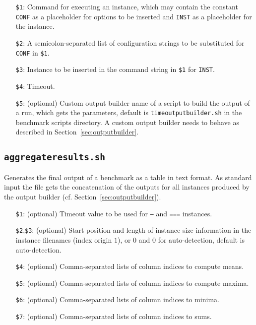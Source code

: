 \documentclass[a4paper]{article}
\begin{document}
		    \medskip{}
		    \begin{itemize}
				\item[{\tt \$1}:] Command for executing an instance, which may contain the constant {\tt CONF} as a placeholder
					for options to be inserted and {\tt INST} as a placeholder for the instance.
				\item[{\tt \$2}:] A semicolon-separated list of configuration strings to be substituted for {\tt CONF} in {\tt \$1}.
				\item[{\tt \$3}:] Instance to be inserted in the command string in {\tt \$1} for {\tt INST}.
				\item[{\tt \$4}:] Timeout.
				\item[{\tt \$5}:] (optional) Custom output builder name of a script to build the output of a run, which gets the parameters, default is {\tt timeoutputbuilder.sh}
					in the benchmark scripts directory. A custom output builder needs to behave as described in Section~\ref{sec:outputbuilder}.
		    \end{itemize}
				
		\subsection{\tt aggregateresults.sh}
		\label{sec:architecture:aggregate}
		
		    Generates the final output of a benchmark as a table in text format.
		    As standard input the file gets the concatenation of the outputs for all instances produced by the output builder (cf. Section~\ref{sec:outputbuilder}).

		    \medskip{}
		    \begin{itemize}
				\item[{\tt \$1}:] (optional) Timeout value to be used for {\tt ---} and {\tt ===} instances.
				\item[{\tt \$2},{\tt \$3}:] (optional) Start position and length of instance size information in the instance filenames (index origin $1$),
					or $0$ and $0$ for auto-detection, default is auto-detection.
				\item[{\tt \$4}:] (optional) Comma-separated lists of column indices to compute means.
				\item[{\tt \$5}:] (optional) Comma-separated lists of column indices to compute maxima.
				\item[{\tt \$6}:] (optional) Comma-separated lists of column indices to minima.
				\item[{\tt \$7}:] (optional) Comma-separated lists of column indices to sums.
		    \end{itemize}
\end{document}
